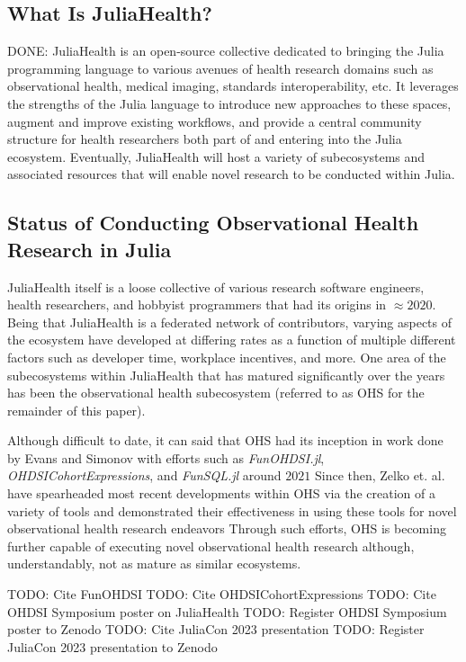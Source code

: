 \documentclass{juliacon}
\begin{document}
\subsection{What Is JuliaHealth?}

DONE:
JuliaHealth is an open-source collective dedicated to bringing the Julia programming language to various avenues of health research domains such as observational health, medical imaging, standards interoperability, etc.
It leverages the strengths of the Julia language to introduce new approaches to these spaces, augment and improve existing workflows, and provide a central community structure for health researchers both part of and entering into the Julia ecosystem.
Eventually, JuliaHealth will host a variety of subecosystems and associated resources that will enable novel research to be conducted within Julia. 

\subsection{Status of Conducting Observational Health Research in Julia}

JuliaHealth itself is a loose collective of various research software engineers, health researchers, and hobbyist programmers that had its origins in $\approx 2020$.
Being that JuliaHealth is a federated network of contributors, varying aspects of the ecosystem have developed at differing rates as a function of multiple different factors such as developer time, workplace incentives, and more.
One area of the subecosystems within JuliaHealth that has matured significantly over the years has been the observational health subecosystem (referred to as OHS for the remainder of this paper).

Although difficult to date, it can said that OHS had its inception in work done by Evans and Simonov with efforts such as \textit{FunOHDSI.jl}, \textit{OHDSICohortExpressions}, and \textit{FunSQL.jl} around $2021$  \cite{kirill_simonov_2023_7705325}
Since then, Zelko et. al. have spearheaded most recent developments within OHS via the creation of a variety of tools and demonstrated their effectiveness in using these tools for novel observational health research endeavors \cite{zelko2022pilot}
Through such efforts, OHS is becoming further capable of executing novel observational health research although, understandably, not as mature as similar ecosystems. 

TODO: Cite FunOHDSI
TODO: Cite OHDSICohortExpressions
TODO: Cite OHDSI Symposium poster on JuliaHealth
TODO: Register OHDSI Symposium poster to Zenodo
TODO: Cite JuliaCon 2023 presentation
TODO: Register JuliaCon 2023 presentation to Zenodo
\end{document}
